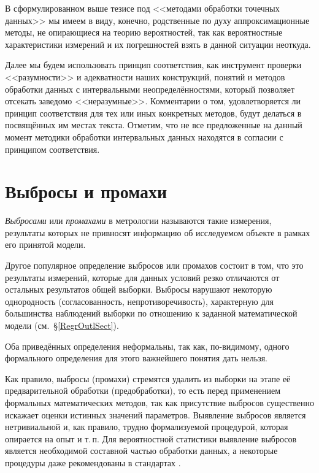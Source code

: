 \documentclass[a5paper,openany]{book}
\begin{document}
В сформулированном выше тезисе под <<методами обработки точечных данных>> мы имеем 
в виду, конечно, родственные по духу аппроксимационные методы, не опирающиеся на теорию 
вероятностей, так как вероятностные характеристики измерений и их погрешностей взять 
в данной ситуации неоткуда.  
   
Далее мы будем использовать принцип соответствия, как инструмент проверки <<разумности>> 
и адекватности наших конструкций, понятий и методов обработки данных с интервальными 
неопределённостями, который позволяет отсекать заведомо <<неразумные>>. Комментарии 
о том, удовлетворяется ли принцип соответствия для тех или иных конкретных методов, 
будут делаться в посвящённых им местах текста. Отметим, что не все предложенные 
на данный момент методики обработки интервальных данных находятся в согласии 
с принципом соответствия. 
  
  
\section{Выбросы и промахи} 
\label{OutlierSect}
  
\textit{Выбросами} или \textit{промахами} в метрологии называются такие измерения, 
результаты которых не привносят информацию об исследуемом объекте в рамках его 
принятой модели. 
  
Другое популярное определение выбросов или промахов состоит в том, что это результаты 
измерений, которые для данных условий резко отличаются от остальных результатов общей 
выборки. Выбросы нарушают некоторую однородность (согласованность, непротиворечивость), 
характерную для большинства наблюдений выборки по отношению к заданной математической 
модели (см.~\S\ref{RegrOutlSect}). 
  
Оба приведённых определения неформальны, так как, по-видимому, одного формального 
определения для этого важнейшего понятия дать нельзя.  
  
Как правило, выбросы (промахи) стремятся удалить из выборки на этапе её предварительной 
обработки (предобработки), то есть перед применением формальных 
математических методов, так как присутствие выбросов существенно искажает оценки 
истинных значений параметров. Выявление выбросов является нетривиальной и, как правило, 
трудно формализуемой процедурой, которая опирается на опыт и т.\,п. Для вероятностной 
статистики выявление выбросов является необходимой составной частью обработки данных, 
а некоторые процедуры даже рекомендованы в стандартах \cite{GOSTDirect}. 
  
\end{document}
